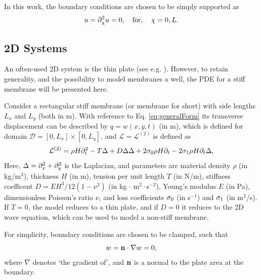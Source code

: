 \documentclass{article}
\begin{document}
In this work, the boundary conditions are chosen to be simply supported as
\begin{equation}
    u = \partial_{\chi}^2 u = 0, \quad \text{for}, \quad \chi = 0, L.
\end{equation}

\subsection{2D Systems}
An often-used 2D system is the thin plate (see e.g. \cite{Webb2015, Willemsen2020}). However, to retain generality, and the possibility to model membranes a well, the PDE for a stiff membrane will be presented here.

Consider a rectangular stiff membrane (or membrane for short) with side lengths $L_x$ and $L_y$ (both in m). With reference to Eq. \eqref{eq:generalForm} its transverse displacement can be described by $q = w(x, y, t)$ (in m), which is defined for domain
$\mathcal{D} = [0, L_x] \times [0, L_y]$, and $\mathcal{L}=\mathcal{L}^{(2)}$ is defined as \cite{Fletcher1998}
\begin{equation}\label{eq:stiffMembrane}
        \mathcal{L}^{(2)} = \rho H\partial_t^2 - T \Delta + D \Delta\Delta+ 2\sigma_{0}\rho H\partial_t - 2 \sigma_{1}\rho H\partial_t\Delta,
\end{equation}
Here, $\Delta = \partial_x^2 + \partial_y^2$ is the Laplacian, and parameters are material density $\rho$ (in kg/m$^3$), thickness $H$ (in m), tension per unit length $T$ (in N/m), stiffness coefficent $D = E H^3 / 12 (1-\nu^2)$ (in kg $\cdot$ m$^2\cdot$s$^{-2}$), Young's modulus $E$ (in Pa), dimensionless Poisson's ratio $\nu$, and loss coefficients $\sigma_{0}$ (in s$^{-1}$) and $\sigma_{1}$ (in m$^2$/s).
If $T = 0$, the model reduces to a thin plate, and if $D=0$ it reduces to the 2D wave equation, which can be used to model a non-stiff membrane.

For simplicity, boundary conditions are chosen to be clamped, such that
\begin{equation}
        w = {\bf n} \cdot \nabla w = 0,
\end{equation}
where $\nabla$ denotes `the gradient of', and ${\bf n}$ is a normal to the plate area at the boundary.
\end{document}
